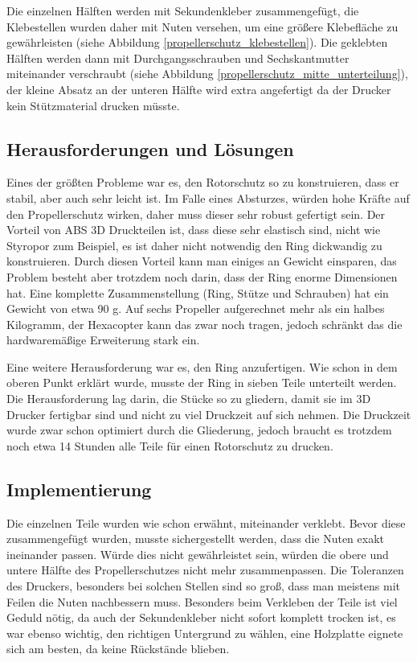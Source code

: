 	Die einzelnen Hälften  werden mit Sekundenkleber zusammengefügt, die Klebestellen wurden daher mit Nuten versehen,
	um eine größere Klebefläche zu gewährleisten (siehe Abbildung \ref{propellerschutz_klebestellen}).
	Die geklebten Hälften werden dann mit Durchgangsschrauben und Sechskantmutter miteinander verschraubt (siehe Abbildung  \ref{propellerschutz_mitte_unterteilung}),
	der kleine Absatz an der unteren Hälfte wird extra angefertigt da der Drucker kein Stützmaterial drucken müsste.

	\subsection{Herausforderungen und Lösungen}

	Eines der größten Probleme war es, den Rotorschutz so zu konstruieren, dass er stabil, aber auch sehr leicht ist.
	Im Falle eines Absturzes, würden hohe Kräfte auf den Propellerschutz wirken, daher muss dieser sehr robust gefertigt sein.
	Der Vorteil von ABS \bzw 3D Druckteilen ist, dass diese sehr elastisch sind, nicht wie Styropor zum Beispiel, es ist daher nicht notwendig den Ring dickwandig zu konstruieren.
 	Durch diesen Vorteil kann man einiges an Gewicht einsparen, das Problem besteht aber trotzdem noch darin, dass der Ring enorme Dimensionen hat.
	Eine komplette Zusammenstellung (Ring, Stütze und Schrauben) hat ein Gewicht von etwa 90 g.
	Auf sechs Propeller aufgerechnet mehr als ein halbes Kilogramm, der Hexacopter kann das zwar noch tragen, jedoch schränkt das die hardwaremäßige Erweiterung stark ein.

	Eine weitere Herausforderung war es, den Ring anzufertigen. Wie schon in dem oberen Punkt erklärt wurde, musste der Ring in sieben Teile unterteilt werden.
	Die Herausforderung lag darin, die Stücke so zu gliedern, damit sie im 3D Drucker fertigbar sind und nicht zu viel Druckzeit auf sich nehmen.
	Die Druckzeit wurde zwar schon optimiert durch die Gliederung, jedoch braucht es trotzdem noch etwa 14 Stunden alle Teile für einen Rotorschutz zu drucken.

	\subsection{Implementierung}

Die einzelnen Teile wurden wie schon erwähnt, miteinander verklebt. Bevor diese zusammengefügt wurden, musste sichergestellt werden, dass die Nuten exakt ineinander passen.
Würde dies nicht gewährleistet sein, würden die obere und untere Hälfte des Propellerschutzes nicht mehr zusammenpassen.
Die Toleranzen des Druckers, besonders bei solchen Stellen sind so groß, dass man meistens mit Feilen die Nuten nachbessern muss.
Besonders beim Verkleben der Teile ist viel Geduld nötig, da auch der Sekundenkleber nicht sofort komplett trocken ist,
es war ebenso wichtig, den richtigen Untergrund zu wählen, eine Holzplatte eignete sich am besten, da keine Rückstände blieben.

